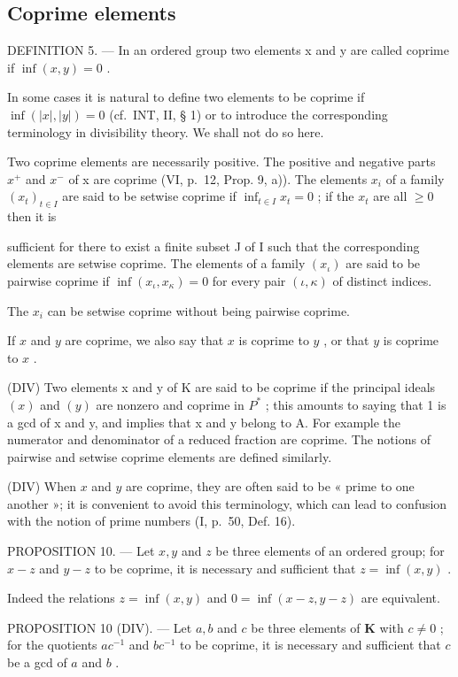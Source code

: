 \subsection{Coprime elements}

DEFINITION 5. --- In an ordered group two elements x and y are called coprime if \(\inf(x, y) = 0\) .

In some cases it is natural to define two elements to be coprime if \(\inf(|x|, |y|) = 0\) (cf.~INT, II, § 1) or to introduce the corresponding terminology in divisibility theory. We shall not do so here.

Two coprime elements are necessarily positive. The positive and negative parts \(x^{+}\) and \(x^{-}\) of x are coprime (VI, p.~12, Prop. 9, a)). The elements \(x_{i}\) of a family \((x_{t})_{t\in I}\) are said to be setwise coprime if \(\inf_{t\in I}x_t = 0\) ; if the \(x_{t}\) are all \(\geqslant 0\) then it is

sufficient for there to exist a finite subset J of I such that the corresponding elements are setwise coprime. The elements of a family \((x_{\iota})\) are said to be pairwise coprime if \(\inf(x_{\iota}, x_{\kappa}) = 0\) for every pair \((\iota, \kappa)\) of distinct indices.

The \(x_{i}\) can be setwise coprime without being pairwise coprime.

If \(x\) and \(y\) are coprime, we also say that \(x\) is coprime to \(y\) , or that \(y\) is coprime to \(x\) .

(DIV) Two elements x and y of K are said to be coprime if the principal ideals \((x)\) and \((y)\) are nonzero and coprime in \(P^{*}\) ; this amounts to saying that 1 is a gcd of x and y, and implies that x and y belong to A. For example the numerator and denominator of a reduced fraction are coprime. The notions of pairwise and setwise coprime elements are defined similarly.

(DIV) When \(x\) and \(y\) are coprime, they are often said to be « prime to one another »; it is convenient to avoid this terminology, which can lead to confusion with the notion of prime numbers (I, p.~50, Def. 16).

PROPOSITION 10. --- Let \(x, y\) and \(z\) be three elements of an ordered group; for \(x - z\) and \(y - z\) to be coprime, it is necessary and sufficient that \(z = \inf(x, y)\) .

Indeed the relations \(z = \inf (x, y)\) and \(0 = \inf (x - z, y - z)\) are equivalent.

PROPOSITION 10 (DIV). --- Let \(a, b\) and \(c\) be three elements of \(\mathbf{K}\) with \(c \neq 0\) ; for the quotients \(ac^{-1}\) and \(bc^{-1}\) to be coprime, it is necessary and sufficient that \(c\) be a gcd of \(a\) and \(b\) .

